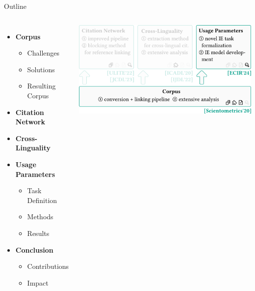 \documentclass[en,16:9,smallfoot]{sdqbeamer}
\begin{document}
   \begin{frame}{Outline}
   \begin{columns}
           \begin{itemize}
               \item \textbf{Corpus}
               \begin{itemize}
                   \item Challenges
                   \item Solutions
                   \item Resulting Corpus
               \end{itemize}
               \item \textbf{Citation Network}
               \item \textbf{Cross-Linguality}
               \item \textbf{Usage Parameters}
               \begin{itemize}
                   \item Task Definition
                   \item Methods
                   \item Results
               \end{itemize}
               \item \textbf{Conclusion}
               \begin{itemize}
                   \item Contributions
                   \item Impact
               \end{itemize}
           \end{itemize}
            \includegraphics[width=\linewidth]{imgs/contrib_overview_v1_sel}
   \end{columns}
   \end{frame}
\end{document}
